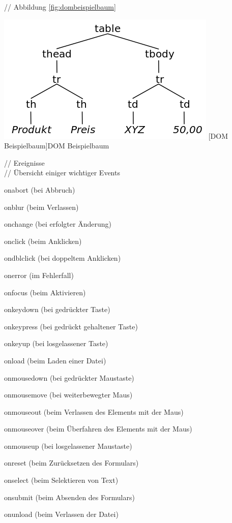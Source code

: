 \documentclass[12pt,a4paper,bibliography=totocnumbered,listof=totocnumbered]{scrartcl}
\begin{document}
// Abbildung \ref{fig:dombeispielbaum}\\
	\vspace{1em}
	\begin{minipage}{\linewidth}
		\centering
		\includegraphics[width=0.5\linewidth]{images/dom_sampletree.png}
		[DOM Beispielbaum]{DOM Beispielbaum}
		\label{fig:dombeispielbaum}
	\end{minipage}

// Ereignisse\\
// Übersicht einiger wichtiger Events
    \begin{compactitem}
	    \item onabort (bei Abbruch)
	    \item onblur (beim Verlassen)
	    \item onchange (bei erfolgter Änderung)
	    \item onclick (beim Anklicken)
	    \item ondblclick (bei doppeltem Anklicken)
	    \item onerror (im Fehlerfall)
	    \item onfocus (beim Aktivieren)
	    \item onkeydown (bei gedrückter Taste)
	    \item onkeypress (bei gedrückt gehaltener Taste)
	    \item onkeyup (bei losgelassener Taste)
	    \item onload (beim Laden einer Datei)
	    \item onmousedown (bei gedrückter Maustaste)
	    \item onmousemove (bei weiterbewegter Maus)
	    \item onmouseout (beim Verlassen des Elements mit der Maus)
	    \item onmouseover (beim Überfahren des Elements mit der Maus)
	    \item onmouseup (bei losgelassener Maustaste)
	    \item onreset (beim Zurücksetzen des Formulars)
	    \item onselect (beim Selektieren von Text)
	    \item onsubmit (beim Absenden des Formulars)
	    \item onunload (beim Verlassen der Datei)
    \end{compactitem}
\end{document}
